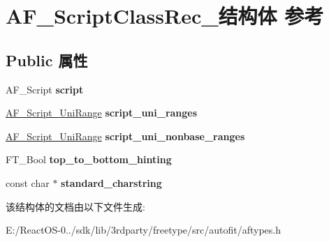 \hypertarget{struct_a_f___script_class_rec__}{}\section{A\+F\+\_\+\+Script\+Class\+Rec\+\_\+结构体 参考}
\label{struct_a_f___script_class_rec__}
\subsection*{Public 属性}
\begin{DoxyCompactItemize}
\item 
\mbox{\label{struct_a_f___script_class_rec___a7567c6bb55125a44344cb339f07ea036}} 
A\+F\+\_\+\+Script {\bfseries script}
\item 
\mbox{\label{struct_a_f___script_class_rec___ae581f78a2c9ad7ae04e52dccbd59965b}} 
\hyperlink{struct_a_f___script___uni_range_rec__}{A\+F\+\_\+\+Script\+\_\+\+Uni\+Range} {\bfseries script\+\_\+uni\+\_\+ranges}
\item 
\mbox{\label{struct_a_f___script_class_rec___a724f5556087c2be0909e700205a19db1}} 
\hyperlink{struct_a_f___script___uni_range_rec__}{A\+F\+\_\+\+Script\+\_\+\+Uni\+Range} {\bfseries script\+\_\+uni\+\_\+nonbase\+\_\+ranges}
\item 
\mbox{\label{struct_a_f___script_class_rec___a68ab11251ce49a3771a8f8469b0d4663}} 
F\+T\+\_\+\+Bool {\bfseries top\+\_\+to\+\_\+bottom\+\_\+hinting}
\item 
\mbox{\label{struct_a_f___script_class_rec___a4f7b85d78a4b1cb1d2d74013617799a4}} 
const char $\ast$ {\bfseries standard\+\_\+charstring}
\end{DoxyCompactItemize}


该结构体的文档由以下文件生成\+:\begin{DoxyCompactItemize}
\item 
E\+:/\+React\+O\+S-\/0../sdk/lib/3rdparty/freetype/src/autofit/aftypes.\+h\end{DoxyCompactItemize}
